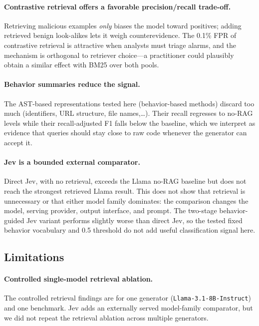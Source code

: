 \paragraph{Contrastive retrieval offers a favorable precision/recall
trade-off.} Retrieving malicious examples \emph{only} biases the model toward
positives; adding retrieved benign look-alikes lets it weigh counterevidence.
The 0.1\% FPR of contrastive retrieval is attractive when analysts must
triage alarms, and the mechanism is orthogonal to retriever choice---a
practitioner could plausibly obtain a similar effect with BM25 over both
pools.

\paragraph{Behavior summaries reduce the signal.} The AST-based
representations tested here (behavior-based methods) discard too much
(identifiers, URL structure, file names,\dots). Their recall
regresses to no-RAG levels while their recall-adjusted F1 falls below the
baseline, which we interpret as evidence that queries should stay close to
raw code whenever the generator can accept it.

\paragraph{Jev is a bounded external comparator.} Direct Jev, with no
retrieval, exceeds the Llama no-RAG baseline but does not reach the strongest
retrieved Llama result. This does not show that retrieval is unnecessary or
that either model family dominates: the comparison changes the model, serving
provider, output interface, and prompt. The two-stage behavior-guided Jev
variant performs slightly worse than direct Jev, so the tested fixed behavior
vocabulary and 0.5 threshold do not add useful classification signal here.

\subsection{Limitations}
\label{sec:limitations}

\paragraph{Controlled single-model retrieval ablation.} The controlled
retrieval findings are for one generator (\texttt{Llama-3.1-8B-Instruct})
and one benchmark. Jev adds an externally served model-family comparator,
but we did not repeat the retrieval ablation across multiple generators.

